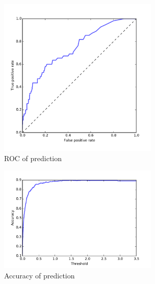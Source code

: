 \documentclass[11pt]{article}
\begin{document}
\label{pa}
\begin{figure}[hbtp]
\begin{center}
  \includegraphics[width=3in]{graph/roc.pdf}
  \caption{ROC of prediction}
  \label{roc}
\end{center}  
\end{figure}

\begin{figure}[hbtp]
\begin{center}
  \includegraphics[width=3in]{graph/acc.pdf}
  \caption{Accuracy of prediction}
  \label{acc}
\end{center}  
\end{figure}
\end{document}
